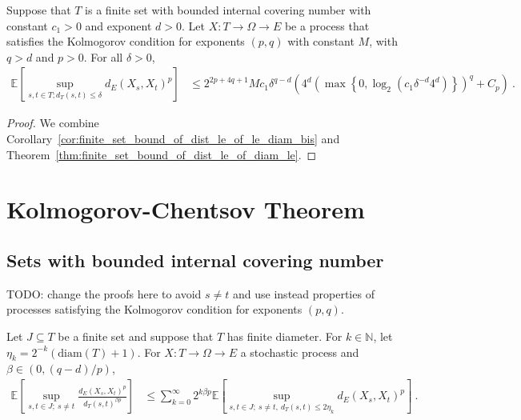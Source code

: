 \begin{corollary}\label{cor:finite_set_bound_of_dist_le}
  \leanok
Suppose that $T$ is a finite set with bounded internal covering number with constant $c_1>0$ and exponent $d > 0$.
Let $X : T \to \Omega \to E$ be a process that satisfies the Kolmogorov condition for exponents $(p,q)$ with constant $M$, with $q > d$ and $p > 0$.
For all $\delta > 0$,
\begin{align*}
  \mathbb{E}\left[ \sup_{s, t \in T; d_T(s, t) \le \delta} d_E(X_s, X_t)^p \right]
  &\le 2^{2p+4q+1} M c_1 \delta^{q-d} \left(4^d \left(\max\left\{0, \log_2 \left(c_1 \delta^{-d} 4^d\right) \right\} \right)^q
    + C_p\right)
  \: .
\end{align*}
\end{corollary}


\begin{proof}\leanok
We combine Corollary~\ref{cor:finite_set_bound_of_dist_le_of_le_diam_bis} and Theorem~\ref{thm:finite_set_bound_of_dist_le_of_diam_le}.
\end{proof}




\section{Kolmogorov-Chentsov Theorem}


\subsection{Sets with bounded internal covering number}

TODO: change the proofs here to avoid $s \ne t$ and use instead properties of processes satisfying the Kolmogorov condition for exponents $(p,q)$.

\begin{lemma}\label{lem:integral_div_dist_le_sum_integral_dist_le}
  \leanok
Let $J \subseteq T$ be a finite set and suppose that $T$ has finite diameter.
For $k \in \mathbb{N}$, let $\eta_k = 2^{-k}(\mathrm{diam}(T) + 1)$.
For $X : T \to \Omega \to E$ a stochastic process and $\beta \in(0, (q - d)/p)$,
\begin{align*}
  \mathbb{E}\left[ \sup_{s, t \in J;\: s \ne t} \frac{d_E(X_s, X_t)^p}{d_T(s, t)^{\beta p}} \right]
  &\le \sum_{k=0}^\infty 2^{k \beta p} \mathbb{E}\left[ \sup_{s, t \in J;\: s \ne t, \: d_T(s, t) \le 2 \eta_k} d_E(X_s, X_t)^p \right]
  \: .
\end{align*}
\end{lemma}

